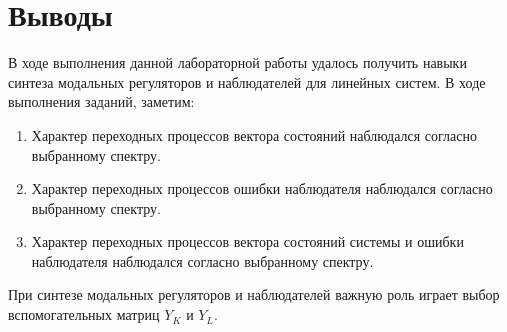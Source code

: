 \section{Выводы}
В ходе выполнения данной лабораторной работы удалось получить навыки синтеза модальных регуляторов
и наблюдателей для линейных систем. В ходе выполнения заданий, заметим:
\begin{enumerate}
    \item Характер переходных процессов вектора состояний наблюдался согласно выбранному спектру.
    \item Характер переходных процессов ошибки наблюдателя наблюдался согласно выбранному спектру.
    \item Характер переходных процессов вектора состояний системы и ошибки наблюдателя наблюдался согласно выбранному спектру.
\end{enumerate}
При синтезе модальных регуляторов и наблюдателей важную роль играет выбор вспомогательных матриц
$Y_K$ и $Y_L$.